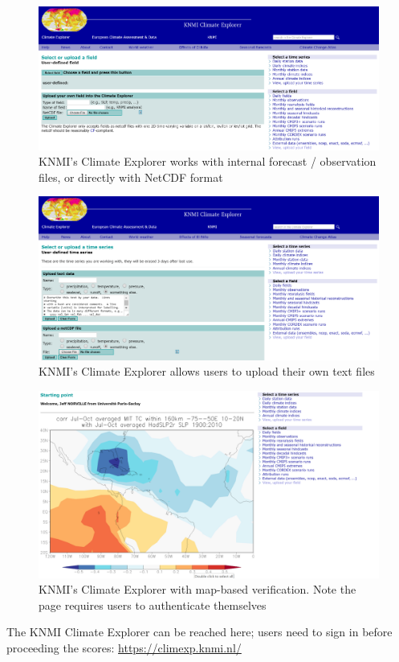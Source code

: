 \documentclass[logos,parttoc,morelanguage=french,morelanguage=german,draft]{orsay-memoire}
\begin{document}
\begin{figure}[hp]
\centering
\includegraphics[width=0.70\linewidth]{images/vfsbKNMI1.png}
  \caption{KNMI's Climate Explorer works with internal forecast / observation files, or directly with NetCDF format}
  \label{fig:vfsbKNMI1}
\end{figure}

\begin{figure}[hp]
\centering
\includegraphics[width=0.70\linewidth]{images/vfsbKNMI2.png}
  \caption{KNMI's Climate Explorer allows users to upload their own text files}
  \label{fig:vfsbKNMI2}
\end{figure}

\begin{figure}[hp]
\centering
\includegraphics[width=0.70\linewidth]{images/vfsbKNMI3.png}
  \caption{KNMI's Climate Explorer with map-based verification. Note the page requires users to authenticate themselves}
  \label{fig:vfsbKNMI3}
\end{figure}

The KNMI Climate Explorer can be reached here; users need to sign in before proceeding the scores: \href{https://climexp.knmi.nl/}{https://climexp.knmi.nl/}
\end{document}
